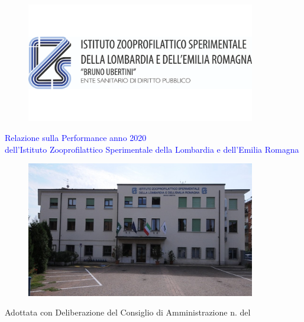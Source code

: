 \documentclass[
  12pt,
]{article}
\author{}
\date{\vspace{-2.5em}}
\begin{document}
\newcommand*\NewPage{\newpage\null\thispagestyle{empty}\newpage\thispagestyle{empty}}

\newpage

\thispagestyle{empty}

\begin{figure}[htbp]
      \begin{center}
        \includegraphics[width=10cm]{figure/Logo-IZSLER.png}
      \end{center}
    \end{figure}

\begin{center}
    
  \LARGE
   \textcolor{blue}{Relazione sulla Performance anno 2020 \\ dell'Istituto Zooprofilattico Sperimentale della Lombardia e dell'Emilia Romagna}
  
  \end{center}

\begin{figure}[htbp]
      \begin{center}
        \includegraphics[width=10cm]{figure/izsler.jpg}
      \end{center}
    \end{figure}

\begin{center} 
 Adottata con Deliberazione del Consiglio di Amministrazione n. del 
 \end{center}
\end{document}

